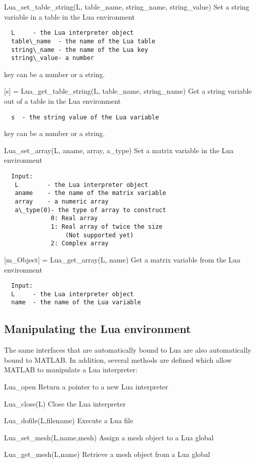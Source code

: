 \begin{codelist}
  \item[Lua\_set\_table\_string(L, table\_name, string\_name, string\_value)]
  Set a string variable in a table in the Lua environment
\begin{verbatim}
  L     - the Lua interpreter object
  table\_name  - the name of the Lua table
  string\_name - the name of the Lua key
  string\_value- a number
\end{verbatim}
  key can be a number or a string.

  \item[{[s]} = Lua\_get\_table\_string(L, table\_name, string\_name)]
  Get a string variable out of a table in the Lua environment
\begin{verbatim}
  s  - the string value of the Lua variable   
\end{verbatim}
  key can be a number or a string.

  \item[Lua\_set\_array(L, aname, array, a\_type)]
  Set a matrix variable in the Lua environment
\begin{verbatim}
  Input:
   L        - the Lua interpreter object
   aname    - the name of the matrix variable
   array    - a numeric array
   a\_type(0)- the type of array to construct
             0: Real array
             1: Real array of twice the size
                 (Not supported yet)
             2: Complex array
\end{verbatim}

  \item[{[m\_Object]} = Lua\_get\_array(L, name)]
  Get a matrix variable from the Lua environment
\begin{verbatim}
  Input:
  L     - the Lua interpreter object
  name  - the name of the Lua variable
\end{verbatim}

\end{codelist}

\subsection{Manipulating the Lua environment}
The same interfaces that are automatically bound to Lua are also
automatically bound to MATLAB.  In addition, several methods are
defined which allow MATLAB to manipulate a Lua interpreter:
\begin{codelist}

  \item[Lua\_open]      
    Return a pointer to a new Lua interpreter 

  \item[Lua\_close(L)]  
    Close the Lua interpreter

  \item[Lua\_dofile(L,filename)]
    Execute a Lua file

  \item[Lua\_set\_mesh(L,name,mesh)]
    Assign a mesh object to a Lua global

  \item[Lua\_get\_mesh(L,name)]
    Retrieve a mesh object from a Lua global

\end{codelist}

